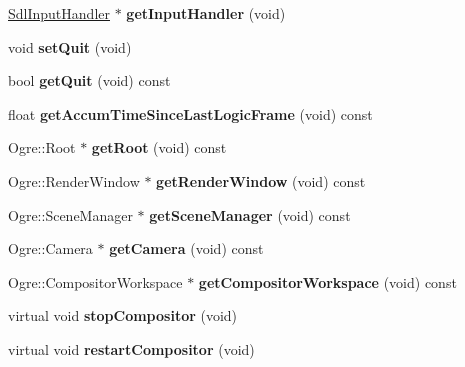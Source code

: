\begin{DoxyCompactItemize}
\item 
\mbox{\label{class_common_1_1_graphics_system_a3996ebbb7e250c04cbf107efafd34984}} 
\hyperlink{class_common_1_1_sdl_input_handler}{Sdl\+Input\+Handler} $\ast$ {\bfseries get\+Input\+Handler} (void)
\item 
\mbox{\label{class_common_1_1_graphics_system_acdbed0670eef23789a3c68e00d88ac4c}} 
void {\bfseries set\+Quit} (void)
\item 
\mbox{\label{class_common_1_1_graphics_system_a216f755133f87e2074a36a556d303e41}} 
bool {\bfseries get\+Quit} (void) const
\item 
\mbox{\label{class_common_1_1_graphics_system_a4a9abd5c431c9e61b48d4d167f775935}} 
float {\bfseries get\+Accum\+Time\+Since\+Last\+Logic\+Frame} (void) const
\item 
\mbox{\label{class_common_1_1_graphics_system_a0890b804419adb1857d359810dec34ff}} 
Ogre\+::\+Root $\ast$ {\bfseries get\+Root} (void) const
\item 
\mbox{\label{class_common_1_1_graphics_system_a7b330688e6c66c74e23ec57eab54f341}} 
Ogre\+::\+Render\+Window $\ast$ {\bfseries get\+Render\+Window} (void) const
\item 
\mbox{\label{class_common_1_1_graphics_system_aef392cd73eb9571778a0910e9b991cac}} 
Ogre\+::\+Scene\+Manager $\ast$ {\bfseries get\+Scene\+Manager} (void) const
\item 
\mbox{\label{class_common_1_1_graphics_system_a7497c78b142d7dd1461418a75804bc58}} 
Ogre\+::\+Camera $\ast$ {\bfseries get\+Camera} (void) const
\item 
\mbox{\label{class_common_1_1_graphics_system_a24280225a9fd08efd4ac9100c7de07c0}} 
Ogre\+::\+Compositor\+Workspace $\ast$ {\bfseries get\+Compositor\+Workspace} (void) const
\item 
\mbox{\label{class_common_1_1_graphics_system_aab69bdc895c97c506caab1fa828b575a}} 
virtual void {\bfseries stop\+Compositor} (void)
\item 
\mbox{\label{class_common_1_1_graphics_system_aa7a5a6ce9e1da97940f5af5785bb4a8a}} 
virtual void {\bfseries restart\+Compositor} (void)
\end{DoxyCompactItemize}
